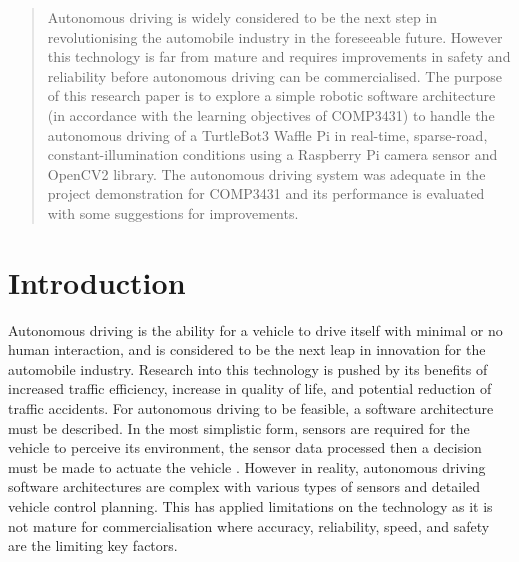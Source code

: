 \documentclass[11pt]{article}
\begin{document}


\begin{abstract}
    Autonomous driving is widely considered to be the next step in revolutionising the automobile industry in the foreseeable future. However this technology is far from mature and requires improvements in safety and reliability before autonomous driving can be commercialised. The purpose of this research paper is to explore a simple robotic software architecture (in accordance with the learning objectives of COMP3431) to handle the autonomous driving of a TurtleBot3 Waffle Pi in real-time, sparse-road, constant-illumination conditions using a Raspberry Pi camera sensor and OpenCV2 library. The autonomous driving system was adequate in the project demonstration for COMP3431 and its performance is evaluated with some suggestions for improvements.
\end{abstract}
\pagebreak


\tableofcontents
\vspace{1cm}
\listoffigures
\vspace{1cm}
\pagebreak



\section{Introduction}
\label{sec:intro}

    Autonomous driving is the ability for a vehicle to drive itself with minimal or no human interaction, and is considered to be the next leap in innovation for the automobile industry. Research into this technology is pushed by its benefits of increased traffic efficiency, increase in quality of life, and potential reduction of traffic accidents. For autonomous driving to be feasible, a software architecture must be described. In the most simplistic form, sensors are required for the vehicle to perceive its environment, the sensor data processed then a decision must be made to actuate the vehicle \cite{autonomous_driving_changes_future}. However in reality, autonomous driving software architectures are complex with various types of sensors and detailed vehicle control planning. This has applied limitations on the technology as it is not mature for commercialisation where accuracy, reliability, speed, and safety are the limiting key factors.
    
\end{document}
